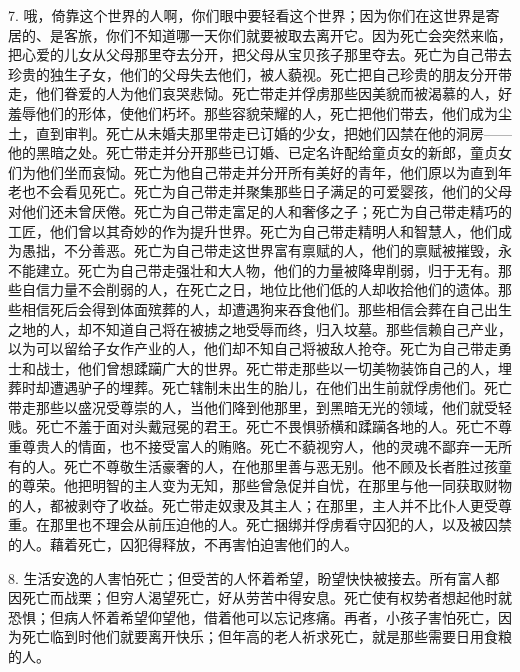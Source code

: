 7. 哦，倚靠这个世界的人啊，你们眼中要轻看这个世界；因为你们在这世界是寄居的、是客旅，你们不知道哪一天你们就要被取去离开它。因为死亡会突然来临，把心爱的儿女从父母那里夺去分开，把父母从宝贝孩子那里夺去。死亡为自己带去珍贵的独生子女，他们的父母失去他们，被人藐视。死亡把自己珍贵的朋友分开带走，他们眷爱的人为他们哀哭悲恸。死亡带走并俘虏那些因美貌而被渴慕的人，好羞辱他们的形体，使他们朽坏。那些容貌荣耀的人，死亡把他们带去，他们成为尘土，直到审判。死亡从未婚夫那里带走已订婚的少女，把她们囚禁在他的洞房——他的黑暗之处。死亡带走并分开那些已订婚、已定名许配给童贞女的新郎，童贞女们为他们坐而哀恸。死亡为他自己带走并分开所有美好的青年，他们原以为直到年老也不会看见死亡。死亡为自己带走并聚集那些日子满足的可爱婴孩，他们的父母对他们还未曾厌倦。死亡为自己带走富足的人和奢侈之子；死亡为自己带走精巧的工匠，他们曾以其奇妙的作为提升世界。死亡为自己带走精明人和智慧人，他们成为愚拙，不分善恶。死亡为自己带走这世界富有禀赋的人，他们的禀赋被摧毁，永不能建立。死亡为自己带走强壮和大人物，他们的力量被降卑削弱，归于无有。那些自信力量不会削弱的人，在死亡之日，地位比他们低的人却收拾他们的遗体。那些相信死后会得到体面殡葬的人，却遭遇狗来吞食他们。那些相信会葬在自己出生之地的人，却不知道自己将在被掳之地受辱而终，归入坟墓。那些信赖自己产业，以为可以留给子女作产业的人，他们却不知自己将被敌人抢夺。死亡为自己带走勇士和战士，他们曾想蹂躏广大的世界。死亡带走那些以一切美物装饰自己的人，埋葬时却遭遇驴子的埋葬。死亡辖制未出生的胎儿，在他们出生前就俘虏他们。死亡带走那些以盛况受尊崇的人，当他们降到他那里，到黑暗无光的领域，他们就受轻贱。死亡不羞于面对头戴冠冕的君王。死亡不畏惧骄横和蹂躏各地的人。死亡不尊重尊贵人的情面，也不接受富人的贿赂。死亡不藐视穷人，他的灵魂不鄙弃一无所有的人。死亡不尊敬生活豪奢的人，在他那里善与恶无别。他不顾及长者胜过孩童的尊荣。他把明智的主人变为无知，那些曾急促并自忧，在那里与他一同获取财物的人，都被剥夺了收益。死亡带走奴隶及其主人；在那里，主人并不比仆人更受尊重。在那里也不理会从前压迫他的人。死亡捆绑并俘虏看守囚犯的人，以及被囚禁的人。藉着死亡，囚犯得释放，不再害怕迫害他们的人。\par

8. 生活安逸的人害怕死亡；但受苦的人怀着希望，盼望快快被接去。所有富人都因死亡而战栗；但穷人渴望死亡，好从劳苦中得安息。死亡使有权势者想起他时就恐惧；但病人怀着希望仰望他，借着他可以忘记疼痛。再者，小孩子害怕死亡，因为死亡临到时他们就要离开快乐；但年高的老人祈求死亡，就是那些需要日用食粮的人。\par


